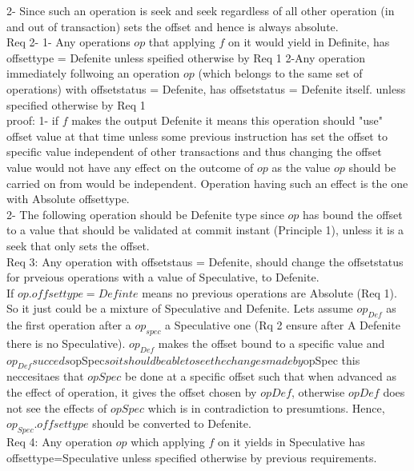 \documentclass[a4paper, 11pt]{article}
\begin{document}
2- Since such an operation is seek and seek regardless of all other operation (in and out of transaction) sets the offset and hence is always absolute.\\

Req 2- 1- Any operations $op$ that applying $f$ on it would yield in Definite, has offsettype = Defenite unless speified otherwise by Req 1  2-Any operation immediately follwoing an operation $op$ (which belongs to the same set of operations) with offsetstatus = Defenite, has offsetstatus = Defenite itself. unless specified otherwise by Req 1\\

proof: 1- if $f$ makes the output Defenite it means this operation should "use" offset value at that time unless some previous instruction has set the offset to specific value independent of other transactions and thus changing the offset value would not have any effect on the outcome of $op$ as the value $op$ should be carried on from would be independent. Operation having such an effect is the one with Absolute offsettype.\\

2- The following operation should be Defenite type since $op$ has bound the offset to a value that should be validated at commit instant (Principle 1), unless it is a seek that only sets the offset.\\ 

Req 3: Any operation with offsetstaus = Defenite, should change the offsetstatus for prveious operations with a value of Speculative, to Defenite.\\

If $op.offsettype = Definte$ means no previous operations are Absolute (Req 1). So it just could be a mixture of Speculative and Defenite. Lets assume $op_{Def}$ as the first operation after a $op_{spec}$ a Speculative one (Rq 2 ensure after A Defenite there is no Speculative).  $op_{Def}$ makes the offset bound to a specific value and $op_{Def} succeds $op{Spec}$ so it should be able to see the changes made by $op{Spec} this neccesitaes that $op{Spec}$ be done at a specific offset such that when advanced as the effect of operation, it gives the offset chosen by $op{Def}$, otherwise $op{Def}$ does not see the effects of $op{Spec}$ which is in contradiction to presumtions. Hence, $op_{Spec}.offsettype$ should be converted to Defenite.\\

Req 4: Any operation $op$ which applying $f$ on it yields in Speculative has offsettype=Speculative unless specified otherwise by previous requirements.\\
\end{document}

